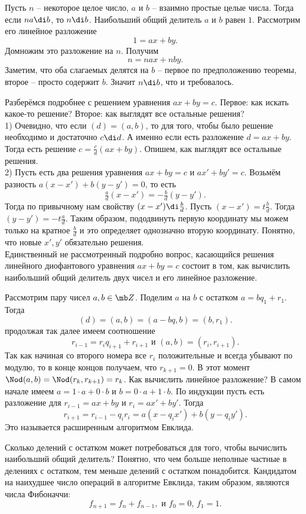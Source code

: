 \lm Пусть $n$ -- некоторое целое число, $a$ и $b$ -- взаимно простые целые числа. Тогда если $na \di b$, то $n\di b$.
\elm
\proof Наибольший общий делитель $a$  и $b$ равен $1$. Рассмотрим его линейное разложение 
$$1=ax+by.$$
Домножим это разложение на $n$. Получим $$n=nax+nby.$$
Заметим, что оба слагаемых делятся на $b$ -- первое по предположению теоремы, второе -- просто содержит $b$. Значит $n \di b$, что и требовалось.
\endproof

Разберёмся подробнее с решением уравнения $ax+by=c$. Первое: как искать какое-то решение? Второе: как выглядят все остальные решения?\\
1) Очевидно, что если $(d)=(a,b)$, то для того, чтобы было решение необходимо и достаточно $c\di d$. А именно если есть разложение $d=ax+by$. Тогда есть решение $c= \frac{c}{d}(ax+by)$. Опишем, как выглядят все остальные решения.\\
2) Пусть есть два решения уравнения $ax+by=c$ и $ax'+by'=c$. Возьмём разность $a(x-x')+b(y-y')=0$, то есть 
$$\tfrac{a}{d}(x-x')=-\tfrac{b}{d}(y-y').$$
Тогда по привычному нам свойству $(x-x')\di \frac{b}{d}$. Пусть $(x-x')=t\frac{b}{d}$. Тогда $(y-y')=-t\frac{a}{d}$. Таким образом, пододвинуть первую координату мы можем только на кратное $\frac{b}{d}$ и это определяет однозначно вторую координату. Понятно, что новые $x',y'$ обязательно решения.\\






Единственный не рассмотренный подробно вопрос, касающийся решения  линейного диофантового уравнения $ax+by=c$ состоит в том, как вычислить наибольший общий делитель двух чисел и его линейное разложение.

Рассмотрим пару чисел $a,b\in \mb Z$. Поделим $a$ на $b$ с остатком $a=bq_1+r_1$. Тогда $$(d)=(a,b)=(a-bq,b)=(b,r_1).$$
продолжая так далее имеем соотношение
$$r_{i-1}=r_iq_{i+1}+r_{i+1}  \text{ и $(a,b)=(r_i,r_{i+1})$}.$$
Так как начиная со второго номера все $r_i$ положительные и всегда убывают по модулю, то в конце концов получаем, что $r_{k+1}=0$.
В этот момент  $\Nod(a,b)=\Nod(r_k,r_{k+1})=r_k$. Как вычислить линейное разложение? В самом начале имеем $a=1\cdot a+0\cdot b$ и $b=0\cdot a+ 1\cdot b$. По индукции пусть есть разложение для $r_{i-1}=ax+by$ и $r_i=ax'+by'$. Тогда $$r_{i+1}=r_{i-1}-q_ir_{i}=a(x-q_ix')+b(y-q_iy').$$
Это называется расширенным алгоритмом Евклида.

Сколько делений с остатком может потребоваться для того, чтобы вычислить наибольший общий делитель?
Понятно, что чем больше неполные частные в делениях с остатком, тем меньше делений с остатком понадобится. Кандидатом на наихудшее число операций в алгоритме Евклида, таким образом, являются числа Фибоначчи:
$$f_{n+1}=f_n+f_{n-1}, \text{ и $f_0=0$, $f_1=1$}.$$

